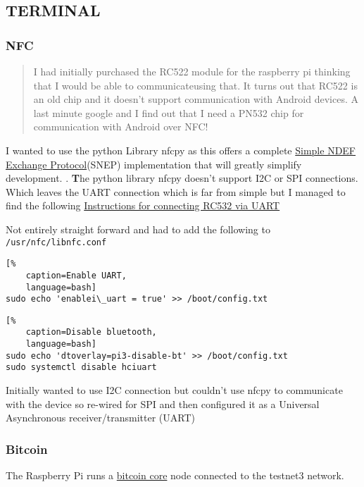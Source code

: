 \documentclass[a4paper]{article}
\begin{document}
\subsection{\textbf{TERMINAL}}
\subsubsection{NFC}

\begin{quote}
I had initially purchased the RC522 module for the raspberry pi thinking that I
would be able to communicateusing that.  It turns out that RC522 is an old
chip and it doesn't support communication with Android devices.  A last minute
google and I find out that I need a PN532 chip for communication with Android
over NFC!
\end{quote}

I wanted to use the python Library nfcpy as this offers a complete
\href{https://nfcpy.readthedocs.io/en/latest/topics/snep.html}{Simple NDEF Exchange
Protocol}(SNEP) implementation that will greatly simplify development.
.
{\textbf The python library nfcpy doesn't support I2C or SPI connections.} Which
leaves the UART connection which is far from simple but I managed to find the
following 
\href{https://learn.adafruit.com/adafruit-nfc-rfid-on-raspberry-pi/building-libnfc}
{Instructions for connecting RC532 via UART}

Not entirely straight forward and had to add the following to
\verb|/usr/nfc/libnfc.conf|

\begin{lstlisting}[%
	caption=Enable UART,
	language=bash]
sudo echo 'enablei\_uart = true' >> /boot/config.txt
\end{lstlisting}

\begin{lstlisting}[%
	caption=Disable bluetooth,
	language=bash]
sudo echo 'dtoverlay=pi3-disable-bt' >> /boot/config.txt
sudo systemctl disable hciuart
\end{lstlisting}

Initially wanted to use I2C connection but couldn't use nfcpy to communicate with
the device so re-wired for SPI and then configured it as a Universal Asynchronous
receiver/transmitter (UART)

\subsubsection{Bitcoin}
The Raspberry Pi runs a \href{https://github.com/bitcoin/bitcoin}{bitcoin core} node
connected to the testnet3 network.
\end{document}
